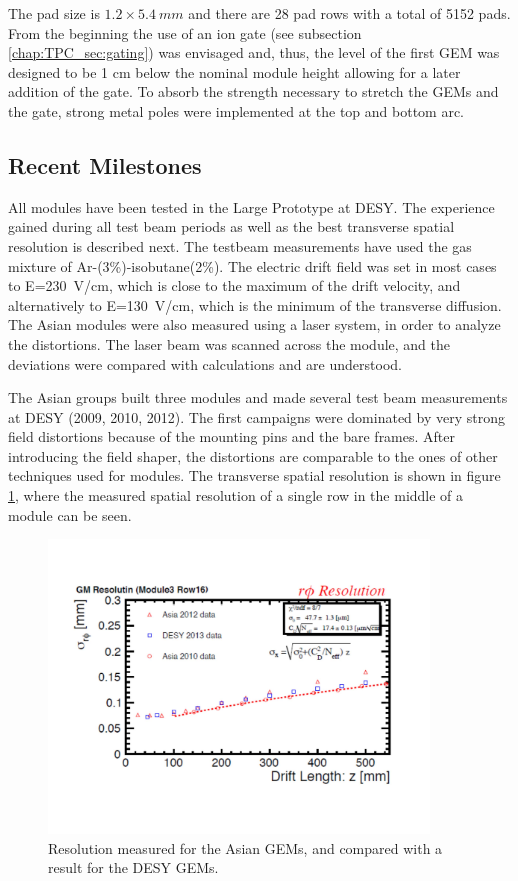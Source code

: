 The pad size is $1.2 \times \SI{5.4}{mm}$ and there are 28 pad rows with a total of 5152 pads.
From the beginning the use of an ion gate
(see subsection \ref{chap:TPC_sec:gating}) was envisaged and, thus, the level of the first GEM was designed
to be 1 cm below the nominal module height allowing for a later addition of the gate. To absorb the strength necessary
to stretch the GEMs and the gate, strong metal poles were implemented at the top and bottom arc.

\subsection{Recent Milestones}

All modules have been tested in the Large Prototype at DESY. The experience gained during all test beam periods as
well as the best transverse spatial resolution is described next. The testbeam measurements have used
the gas mixture of Ar-(3\%)-isobutane(2\%). The electric drift field was set in most cases to
E=\SI{230}{V/cm}, which is close to the maximum of the drift velocity, and alternatively to
E=\SI{130}{V/cm}, which is the minimum of the transverse diffusion.
The Asian modules were also measured using a laser system, in order to analyze the distortions.
The laser beam was scanned across the module, and the deviations were compared with calculations and are understood.

The Asian groups built three modules and made several test beam measurements at DESY (2009, 2010, 2012).
The first campaigns were dominated by very strong field distortions because of the mounting pins and the bare frames.
After introducing the field shaper, the distortions are comparable to the ones of other techniques used for modules.
The transverse spatial resolution is shown in figure \ref{fig_Fig2asiangemresolution}, where the measured spatial
resolution of a single row in the middle of a module can be seen.

\begin{figure}[!htb]
  \centering
  \includegraphics[width=0.9\textwidth]{Tracker/TPC_Bonn/plots/TPC-AG_Fig2asiangemresolution.pdf}
  \caption{Resolution measured for the Asian GEMs, and compared with a result for the DESY GEMs.}
  \label{fig_Fig2asiangemresolution}
\end{figure}

